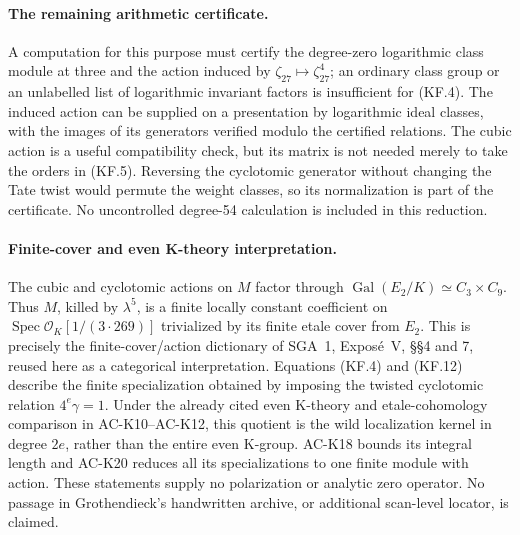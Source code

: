 \paragraph{The remaining arithmetic certificate.}
A computation for this purpose must certify the degree-zero
logarithmic class module at three and the action induced by
$\zeta_{27}\mapsto\zeta_{27}^4$; an ordinary class group or
an unlabelled list of logarithmic invariant factors is
insufficient for (KF.4).  The induced action can be supplied
on a presentation by logarithmic ideal classes, with the images
of its generators verified modulo the certified relations.
The cubic action is a useful compatibility check, but its
matrix is not needed merely to take the orders in (KF.5).
Reversing the cyclotomic generator without changing the Tate
twist would permute the weight classes, so its normalization
is part of the certificate.  No uncontrolled degree-54
calculation is included in this reduction.

\paragraph{Finite-cover and even K-theory interpretation.}
The cubic and cyclotomic actions on $M$ factor through
$\operatorname{Gal}(E_2/K)\simeq C_3\times C_9$.
Thus $M$, killed by $\lambda^5$, is a finite locally constant
coefficient on $\operatorname{Spec}\mathcal O_K[1/(3\cdot269)]$
trivialized by its finite etale cover from $E_2$.
This is precisely the finite-cover/action dictionary of
SGA~1, Expos\'e~V, \S\S4 and 7, reused here as a categorical
interpretation.  Equations (KF.4) and (KF.12) describe the
finite specialization obtained by imposing the twisted
cyclotomic relation $4^e\gamma=1$.
Under the already cited even K-theory and etale-cohomology
comparison in AC-K10--AC-K12, this quotient is the wild
localization kernel in degree $2e$, rather than the entire
even K-group.  AC-K18 bounds its integral length and AC-K20
reduces all its specializations to one finite module with
action.  These statements supply no polarization or analytic
zero operator.  No passage in Grothendieck's handwritten
archive, or additional scan-level locator, is claimed.
